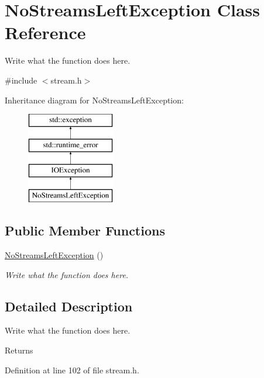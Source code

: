 \hypertarget{classNoStreamsLeftException}{\section{No\+Streams\+Left\+Exception Class Reference}
\label{classNoStreamsLeftException}
}


Write what the function does here.  




{\ttfamily \#include $<$stream.\+h$>$}

Inheritance diagram for No\+Streams\+Left\+Exception\+:\begin{figure}[H]
\begin{center}
\leavevmode
\includegraphics[height=4.000000cm]{classNoStreamsLeftException}
\end{center}
\end{figure}
\subsection*{Public Member Functions}
\begin{DoxyCompactItemize}
\item 
\hyperlink{classNoStreamsLeftException_a44c857faac6b8f16fa7dc2f701baf99b}{No\+Streams\+Left\+Exception} ()
\begin{DoxyCompactList}\small\item\em Write what the function does here. \end{DoxyCompactList}\end{DoxyCompactItemize}


\subsection{Detailed Description}
Write what the function does here. 

\begin{DoxyReturn}{Returns}

\end{DoxyReturn}


Definition at line 102 of file stream.\+h.



